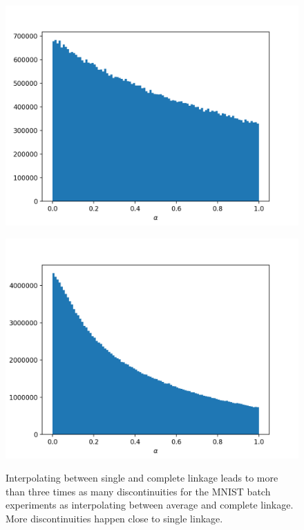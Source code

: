 \begin{figure}[h]
\begin{minipage}{.45\textwidth}
  \centering
  {\includegraphics[width=\linewidth]{plots/mnist_ac_split_counts}}
\end{minipage}\quad
\begin{minipage}{.45\textwidth}
  \centering
  {\includegraphics[width=\linewidth]{plots/mnist_sc_split_counts}}
\end{minipage}
\caption{Interpolating between single and complete linkage leads to more than three times as many discontinuities for the MNIST batch experiments as interpolating between average and complete linkage. More discontinuities happen close to single linkage.}
\label{fig:splits}
\end{figure}

